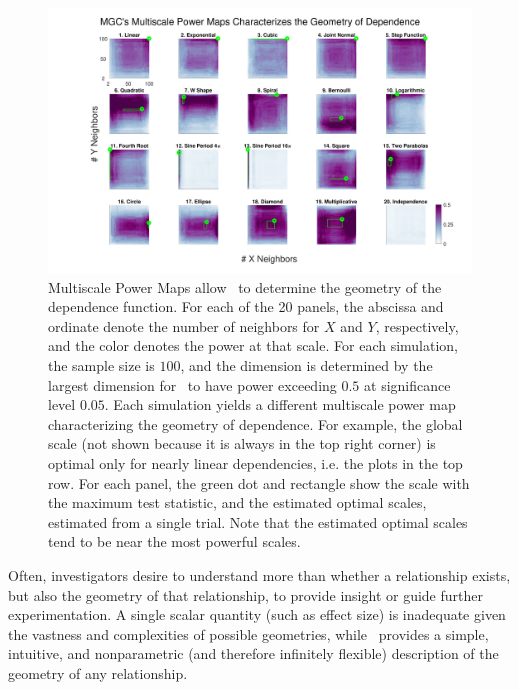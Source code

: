 \documentclass[11pt]{extarticle}
\begin{document}
\begin{figure}[!ht]
\includegraphics[width=1.0\textwidth,trim={3cm 0.5cm 1.8cm 0.5cm},clip]{Figures/FigHDHeat}
\caption{Multiscale Power Maps allow \Mgc~to determine the geometry of the dependence function.
For each of the 20 panels, the abscissa and ordinate denote the number of neighbors for $X$ and  $Y$, respectively, and the color denotes the power at that scale. For each simulation, the sample size is $100$,  and the dimension is determined by the largest dimension for \Mgc~to have power exceeding $0.5$ at significance level $0.05$. Each simulation yields a different multiscale power map characterizing the geometry of dependence.
For example, the global scale (not shown because it  is always in the top right corner) is optimal only for nearly linear dependencies, i.e. the plots in the top row.
For each panel, the green dot and rectangle show the scale with the maximum test statistic,  and the estimated optimal scales, estimated from a single trial. Note that the estimated optimal scales tend to be near the most powerful scales.
}
\label{f:powermaps}
\end{figure}

Often, investigators desire to understand more than whether a relationship exists, but also the geometry of that relationship, to provide insight or guide further experimentation.
A single scalar quantity (such as effect size) is inadequate given the vastness and complexities of possible geometries, while \Mgc~provides a simple, intuitive, and nonparametric (and therefore infinitely flexible) description of the geometry of any relationship.
\end{document}
